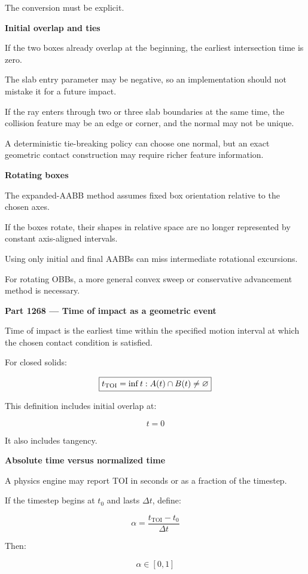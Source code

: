 The conversion must be explicit.

\textbf{Initial overlap and ties}

If the two boxes already overlap at the beginning, the earliest intersection time is zero.

The slab entry parameter may be negative, so an implementation should not mistake it for a future impact.

If the ray enters through two or three slab boundaries at the same time, the collision feature may be an edge or corner, and the normal may not be unique.

A deterministic tie-breaking policy can choose one normal, but an exact geometric contact construction may require richer feature information.

\textbf{Rotating boxes}

The expanded-AABB method assumes fixed box orientation relative to the chosen axes.

If the boxes rotate, their shapes in relative space are no longer represented by constant axis-aligned intervals.

Using only initial and final AABBs can miss intermediate rotational excursions.

For rotating OBBs, a more general convex sweep or conservative advancement method is necessary.

\textbf{Part 1268 --- Time of impact as a geometric event}

Time of impact is the earliest time within the specified motion interval at which the chosen contact condition is satisfied.

For closed solids:

\[
\boxed{ t_{\mathrm{TOI}}= \inf\\{t:A(t)\cap B(t)\ne\varnothing\\} }
\]

This definition includes initial overlap at:

\[
t=0
\]

It also includes tangency.

\textbf{Absolute time versus normalized time}

A physics engine may report TOI in seconds or as a fraction of the timestep.

If the timestep begins at \(t_0\) and lasts \(\Delta t\), define:

\[
\boxed{ \alpha=\frac{t_{\mathrm{TOI}}-t_0}{\Delta t} }
\]

Then:

\[
\alpha\in[0,1]
\]

